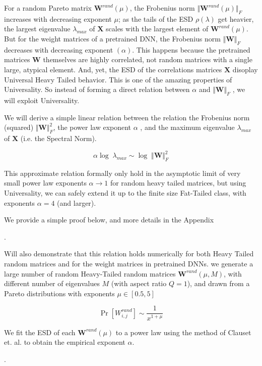 { For a random Pareto matrix $\mathbf{W}^{rand}(\mu)$,  the Frobenius norm  $\Vert\mathbf{W}^{rand}(\mu)\Vert_{F}$ increases with 
 decreasing exponent $\mu$;  as the tails of the ESD $\rho(\lambda)$ get heavier, the largest eigenvalue $\lambda_{max}$ of $\mathbf{X}$
  scales with the largest element of  $\mathbf{W}^{rand}(\mu)$.  But for the weight matrices of a pretrained DNN,
  the Frobenius norm $\Vert\mathbf{W}\Vert_{F}$ decreases with decreasing exponent $(\alpha)$.  
  This happens because the pretrained matrices  $\mathbf{W}$ themselves are highly correlated, not random matrices
  with a single large, atypical element.   And, yet, the ESD of the correlations matrices $\mathbf{X}$ disoplay
  Universal Heavy Tailed behavior. This is one of the amazing properties of Universality.
    So instead of forming a direct relation between $\alpha$ and  $\Vert\mathbf{W}\Vert_{F}$ , we will exploit Universality.  

We will derive a simple linear relation between the relation the Frobenius norm (squared) $\Vert\mathbf{W}\Vert^{2}_{F}$, the
power law exponent  $\alpha$ , and the maximum eigenvalue $\lambda_{max}$ of $\mathbf{X}$ (i.e. the Spectral Norm).  

$$\alpha\log\;\lambda_{max}\sim\log\;\Vert\mathbf{W}\Vert^{2}_{F}$$

This approximate relation formally only hold in the asymptotic limit of very small power law exponents $\alpha\rightarrow 1$ for
random heavy tailed matrices, but using Universality, we can safely extend it up to the finite size Fat-Tailed class, with
exponents $\alpha=4$ (and larger).  

We provide a simple proof below, and more details in the Appendix}.

Will also demonstrate that this relation holds numerically for both Heavy Tailed random matrices and for 
the weight matrices in pretrained DNNs.
  we generate a large number of random Heavy-Tailed random matrices $\mathbf{W}^{rand}(\mu,M)$, 
with different number of eigenvalues $M$ (with aspect ratio $Q=1$), 
and drawn from a Pareto distributions with exponents $\mu\in[0.5, 5]$

$$\Pr[{W}^{rand}_{i,j}]\sim\dfrac{1}{x^{1+\mu}}$$

We fit the ESD of each $\mathbf{W}^{rand}(\mu)$ to a power law using the method of Clauset et. al. to obtain the empirical exponent $\alpha$.  

.

